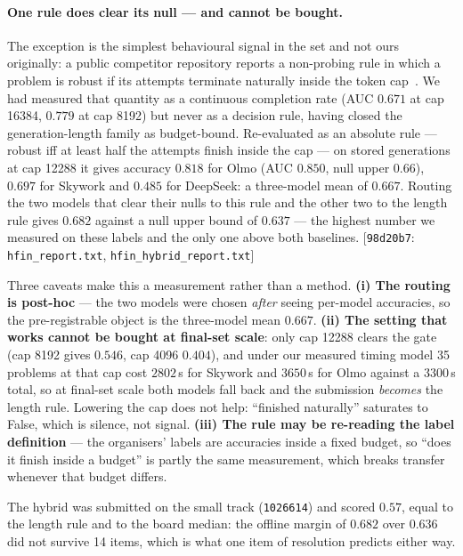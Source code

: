 \documentclass[10pt]{article}
\newcommand{\cmt}[2]{{\footnotesize\textsf{[}\texttt{#1}\textsf{:} #2\textsf{]}}}
\begin{document}
\paragraph{One rule does clear its null --- and cannot be bought.} The exception is the simplest
behavioural signal in the set and not ours originally: a public competitor repository reports a
non-probing rule in which a problem is robust if its attempts terminate naturally inside the token
cap~\cite{econlearn}. We had measured that quantity as a continuous completion rate (AUC $0.671$ at
cap 16384, $0.779$ at cap 8192) but never as a decision rule, having closed the generation-length
family as budget-bound. Re-evaluated as an absolute rule --- robust iff at least half the attempts
finish inside the cap --- on stored generations at cap 12288 it gives accuracy $0.818$ for Olmo
(AUC $0.850$, null upper $0.66$), $0.697$ for Skywork and $0.485$ for DeepSeek: a three-model mean of
$\mathbf{0.667}$. Routing the two models that clear their nulls to this rule and the other two to the
length rule gives $\mathbf{0.682}$ against a null upper bound of $0.637$ --- the highest number we
measured on these labels and the only one above both baselines.
\cmt{98d20b7}{\texttt{hfin\_report.txt}, \texttt{hfin\_hybrid\_report.txt}}

Three caveats make this a measurement rather than a method. \textbf{(i) The routing is post-hoc}
--- the two models were chosen \emph{after} seeing per-model accuracies, so the pre-registrable
object is the three-model mean $0.667$. \textbf{(ii) The setting that works cannot be bought at
final-set scale}: only cap 12288 clears the gate (cap 8192 gives $0.546$, cap 4096 $0.404$), and
under our measured timing model 35 problems at that cap cost $2802$\,s for Skywork and $3650$\,s for
Olmo against a $3300$\,s total, so at final-set scale both models fall back and the submission
\emph{becomes} the length rule. Lowering the cap does not help: ``finished naturally'' saturates to
False, which is silence, not signal. \textbf{(iii) The rule may be re-reading the label definition}
--- the organisers' labels are accuracies inside a fixed budget, so ``does it finish inside a
budget'' is partly the same measurement, which breaks transfer whenever that budget differs.

The hybrid was submitted on the small track (\texttt{1026614}) and scored $\mathbf{0.57}$, equal to
the length rule and to the board median: the offline margin of $0.682$ over $0.636$ did not survive
14 items, which is what one item of resolution predicts either way.
\end{document}
